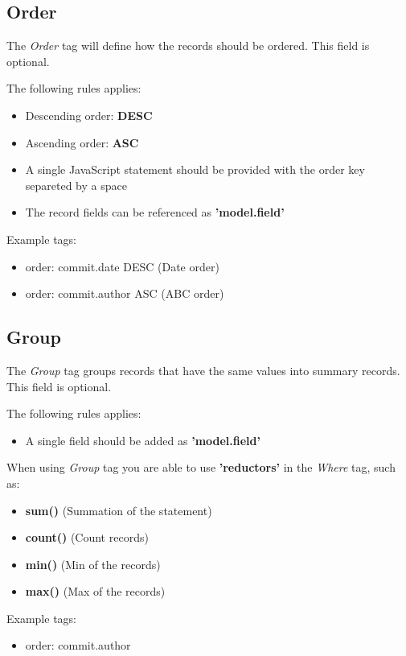 \subsection{Order}

The \textit{Order} tag will define how the records should be ordered.
This field is optional.

The following rules applies:

\begin{itemize}
	\item Descending order: \textbf{DESC}
	\item Ascending order: \textbf{ASC}
	\item A single JavaScript statement should be provided with the order key separeted by a space
	\item The record fields can be referenced as \textbf{'{model}.{field}'}
\end{itemize}

Example tags:
\begin{itemize}
	\item order: commit.date DESC (Date order)
	\item order: commit.author ASC (ABC order)
\end{itemize}

\subsection{Group}

The \textit{Group} tag groups records that have the same values into summary records.
This field is optional.

The following rules applies:
\begin{itemize}
	\item A single field should be added as \textbf{'{model}.{field}'}
\end{itemize}

When using \textit{Group} tag you are able to use \textbf{'reductors'} in the \textit{Where} tag, such as:
\begin{itemize}
	\item \textbf{sum()} (Summation of the statement)
	\item \textbf{count()} (Count records)
	\item \textbf{min()} (Min of the records)
	\item \textbf{max()} (Max of the records)
\end{itemize}

Example tags:
\begin{itemize}
	\item order: commit.author
\end{itemize}

